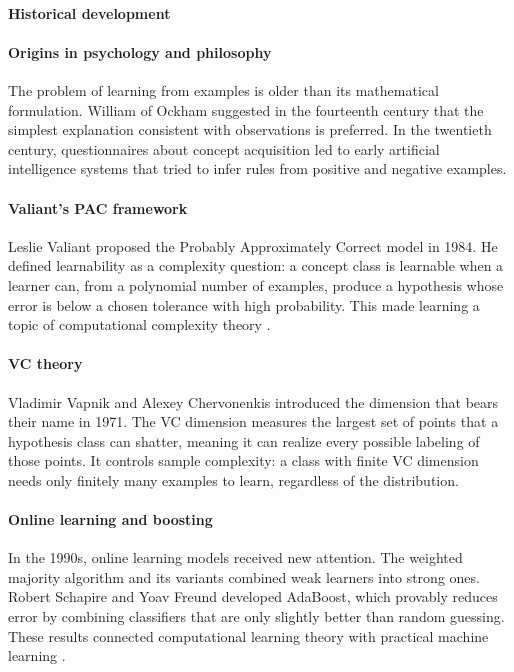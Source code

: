 \paragraph{Historical development}
\begin{historylist}
\paragraph{Origins in psychology and philosophy}
The problem of learning from examples is older than its mathematical formulation. William of Ockham suggested in the fourteenth century that the simplest explanation consistent with observations is preferred. In the twentieth century, questionnaires about concept acquisition led to early artificial intelligence systems that tried to infer rules from positive and negative examples.

\paragraph{Valiant's PAC framework}
Leslie Valiant proposed the Probably Approximately Correct model in 1984. He defined learnability as a complexity question: a concept class is learnable when a learner can, from a polynomial number of examples, produce a hypothesis whose error is below a chosen tolerance with high probability. This made learning a topic of computational complexity theory \cite{colt_ref1}.

\paragraph{VC theory}
Vladimir Vapnik and Alexey Chervonenkis introduced the dimension that bears their name in 1971. The VC dimension measures the largest set of points that a hypothesis class can shatter, meaning it can realize every possible labeling of those points. It controls sample complexity: a class with finite VC dimension needs only finitely many examples to learn, regardless of the distribution.

\paragraph{Online learning and boosting}
In the 1990s, online learning models received new attention. The weighted majority algorithm and its variants combined weak learners into strong ones. Robert Schapire and Yoav Freund developed AdaBoost, which provably reduces error by combining classifiers that are only slightly better than random guessing. These results connected computational learning theory with practical machine learning \cite{colt_ref3}.


\end{historylist}
